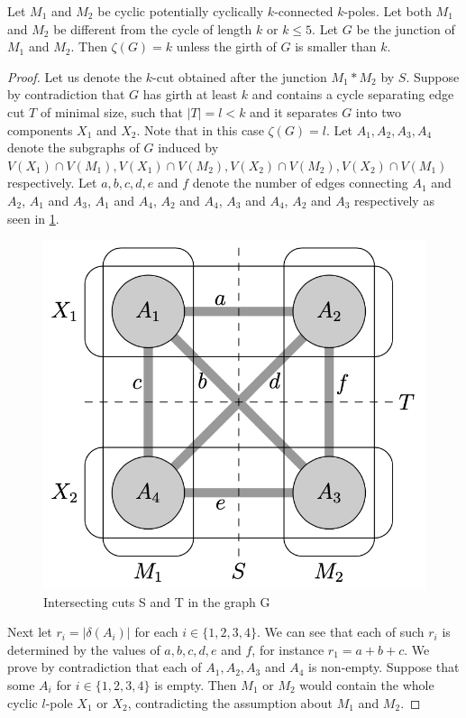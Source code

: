 \documentclass[12pt, twoside]{book}
\begin{document}
\begin{theorem}\label{th:junction-of-kpoles-cyclic-edge-connectivity}
	Let $M_1$ and $M_2$ be cyclic potentially cyclically $k$-connected $k$-poles. Let both $M_1$ and $M_2$ be different from the cycle of length $k$ or $k\leq 5$. Let $G$ be the junction of $M_1$ and $M_2$. Then $\zeta(G)=k$ unless the girth of $G$ is smaller than $k$.
\end{theorem}

\begin{proof}
	Let us denote the $k$-cut obtained after the junction $M_1*M_2$ by $S$. Suppose by contradiction that $G$ has girth at least $k$ and contains a cycle separating edge cut $T$ of minimal size, such that $|T|=l<k$ and it separates $G$ into two components $X_1$ and $X_2$. Note that in this case $\zeta(G)=l$. Let $A_1,A_2,A_3,A_4$ denote the subgraphs of $G$ induced by $V(X_1)\cap V(M_1), V(X_1)\cap V(M_2), V(X_2)\cap V(M_2), V(X_2)\cap V(M_1)$ respectively. Let $a,b,c,d,e$ and $f$ denote the number of edges connecting $A_1$ and $A_2$, $A_1$ and $A_3$, $A_1$ and $A_4$, $A_2$ and $A_4$, $A_3$ and $A_4$, $A_2$ and $A_3$ respectively as seen in \cref{fig:rajnik-cyclic-part-junction-illustration}.
	
	\begin{figure}
		\centering
		\includegraphics[width=0.5\linewidth]{graphs/rajnik-cyclic-part-junction-illustration}
		\caption{\cite{Rajnik_phd} Intersecting cuts S and T in the graph G}
		\label{fig:rajnik-cyclic-part-junction-illustration}
	\end{figure}
	
	Next let $r_i=|\delta(A_i)|$ for each $i\in\{1,2,3,4\}$. We can see that each of such $r_i$ is determined by the values of $a,b,c,d,e$ and $f$, for instance $r_1=a+b+c$. We prove by contradiction that each of $A_1, A_2,A_3$ and $A_4$ is non-empty. Suppose that some $A_i$ for $i\in\{1,2,3,4\}$ is empty. Then $M_1$ or $M_2$ would contain the whole cyclic $l$-pole $X_1$ or $X_2$, contradicting the assumption about $M_1$ and $M_2$.
	

\end{proof}
\end{document}
